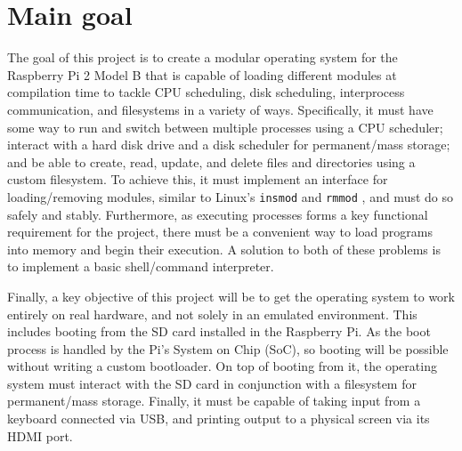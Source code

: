 \documentclass[10pt,a4paper]{article}
\newcommand{\code}[1]{\texttt{#1}}
\begin{document}
\section*{Main goal}
The goal of this project is to create a modular operating system for the
Raspberry Pi 2 Model B that is capable of loading different modules at
compilation time to tackle CPU scheduling, disk scheduling, interprocess
communication, and filesystems in a variety of ways. Specifically, it must have
some way to run and switch between multiple processes using a CPU scheduler;
interact with a hard disk drive and a disk scheduler for permanent/mass storage;
and be able to create, read, update, and delete files and directories using a
custom filesystem.  To achieve this, it must implement an interface for
loading/removing modules, similar to Linux's \code{insmod} and \code{rmmod}
\cite{insmod}, and must do so safely and stably.  Furthermore, as executing
processes forms a key functional requirement for the project, there must be a
convenient way to load programs into memory and begin their execution. A
solution to both of these problems is to implement a basic shell/command
interpreter.

Finally, a key objective of this project will be to get the operating system to
work entirely on real hardware, and not solely in an emulated environment. This
includes booting from the SD card installed in the Raspberry Pi. As the boot
process is handled by the Pi's System on Chip (SoC), so booting will be possible
without writing a custom bootloader. On top of booting from it, the operating
system must interact with the SD card in conjunction with a filesystem for
permanent/mass storage. Finally, it must be capable of taking input from a
keyboard connected via USB, and printing output to a physical screen via its
HDMI port.
\end{document}
